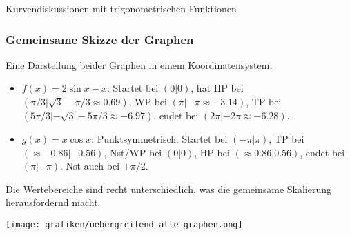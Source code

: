 \begin{loesungsumgebung}{Kurvendiskussionen mit trigonometrischen Funktionen}
\subsubsection*{Gemeinsame Skizze der Graphen}
Eine Darstellung beider Graphen in einem Koordinatensystem.
\begin{itemize}
    \item $f(x)=2\sin x - x$: Startet bei $(0|0)$, hat HP bei $(\pi/3|\sqrt{3}-\pi/3 \approx 0.69)$, WP bei $(\pi|-\pi \approx -3.14)$, TP bei $(5\pi/3|-\sqrt{3}-5\pi/3 \approx -6.97)$, endet bei $(2\pi|-2\pi \approx -6.28)$.
    \item $g(x)=x\cos x$: Punktsymmetrisch. Startet bei $(-\pi|\pi)$, TP bei $(\approx -0.86|-0.56)$, Nst/WP bei $(0|0)$, HP bei $(\approx 0.86|0.56)$, endet bei $(\pi|-\pi)$. Nst auch bei $\pm \pi/2$.
\end{itemize}
Die Wertebereiche sind recht unterschiedlich, was die gemeinsame Skalierung herausfordernd macht.

\begin{center}
\texttt{[image: grafiken/uebergreifend\_alle\_graphen.png]}
\label{fig:kurvendisk_trig_kombiniert}
\end{center}

\end{loesungsumgebung}


